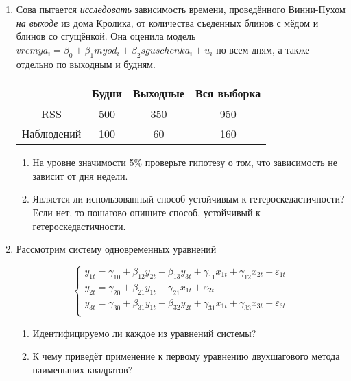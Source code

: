 \begin{enumerate}
\item Сова пытается \textit{исследовать} зависимость времени,
проведённого Винни-Пухом \textit{на выходе} из дома Кролика,
от количества съеденных блинов с мёдом и блинов со сгущёнкой.
Она оценила модель $vremya_i = \beta_0 + \beta_1 myod_i + \beta_2 sguschenka_i + u_i$
по всем дням, а также отдельно по выходным и будням.

    \begin{center}
 			\begin{tabular}{c|ccc}
				\toprule
				& Будни & Выходные & Вся выборка \\
				\midrule
                RSS & 500 & 350 & 950 \\
                Наблюдений & 100 & 60 & 160 \\
				\bottomrule
			\end{tabular}
		\end{center}

\begin{enumerate}
\item На уровне значимости 5\% проверьте гипотезу о том, что зависимость не зависит от дня недели.
\item Является ли использованный способ устойчивым к гетероскедастичности?
Если нет, то пошагово опишите способ, устойчивый к гетероскедастичности.
\end{enumerate}


\item
Рассмотрим систему одновременных уравнений

\[
    \begin{cases}
    y_{1t} = \gamma_{10} + \beta_{12} y_{2t} + \beta_{13} y_{3t} + \gamma_{11} x_{1t} + \gamma_{12} x_{2t} + \varepsilon_{1t} \\
    y_{2t} = \gamma_{20} + \beta_{21} y_{1t} + \gamma_{21} x_{1t} + \varepsilon_{2t} \\
    y_{3t} = \gamma_{30} + \beta_{31} y_{1t} + \beta_{32} y_{2t} + \gamma_{31} x_{1t} + \gamma_{33} x_{3t} + \varepsilon_{3t} \\
    \end{cases}
\]

\begin{enumerate}
    \item Идентифицируемо ли каждое из уравнений системы?
    \item К чему приведёт применение к первому уравнению двухшагового метода наименьших квадратов?
\end{enumerate}


\end{enumerate}
